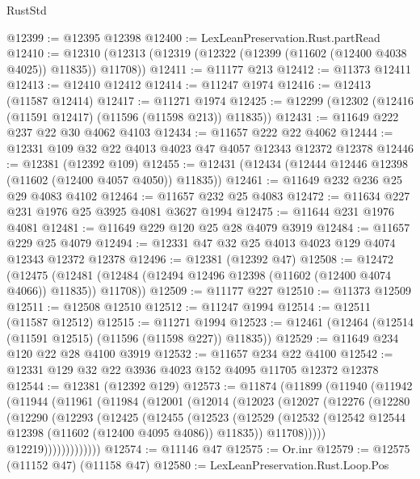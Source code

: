 \begin{lexlean}{RustStd}
\begin{coremodule}
@12399 := @12395 @12398
@12400 := LexLeanPreservation.Rust.partRead
@12410 := @12310 (@12313 (@12319 (@12322 (@12399 (@11602 (@12400 @4038 @4025)) @11835)) @11708))
@12411 := @11177 @213
@12412 := @11373 @12411
@12413 := @12410 @12412
@12414 := @11247 @1974
@12416 := @12413 (@11587 @12414)
@12417 := @11271 @1974
@12425 := @12299 (@12302 (@12416 (@11591 @12417) (@11596 (@11598 @213)) @11835))
@12431 := @11649 @222 @237 @22 @30 @4062 @4103
@12434 := @11657 @222 @22 @4062
@12444 := @12331 @109 @32 @22 @4013 @4023 @47 @4057 @12343 @12372 @12378
@12446 := @12381 (@12392 @109)
@12455 := @12431 (@12434 (@12444 @12446 @12398 (@11602 (@12400 @4057 @4050)) @11835))
@12461 := @11649 @232 @236 @25 @29 @4083 @4102
@12464 := @11657 @232 @25 @4083
@12472 := @11634 @227 @231 @1976 @25 @3925 @4081 @3627 @1994
@12475 := @11644 @231 @1976 @4081
@12481 := @11649 @229 @120 @25 @28 @4079 @3919
@12484 := @11657 @229 @25 @4079
@12494 := @12331 @47 @32 @25 @4013 @4023 @129 @4074 @12343 @12372 @12378
@12496 := @12381 (@12392 @47)
@12508 := @12472
    (@12475 (@12481 (@12484 (@12494 @12496 @12398 (@11602 (@12400 @4074 @4066)) @11835)) @11708))
@12509 := @11177 @227
@12510 := @11373 @12509
@12511 := @12508 @12510
@12512 := @11247 @1994
@12514 := @12511 (@11587 @12512)
@12515 := @11271 @1994
@12523 := @12461 (@12464 (@12514 (@11591 @12515) (@11596 (@11598 @227)) @11835))
@12529 := @11649 @234 @120 @22 @28 @4100 @3919
@12532 := @11657 @234 @22 @4100
@12542 := @12331 @129 @32 @22 @3936 @4023 @152 @4095 @11705 @12372 @12378
@12544 := @12381 (@12392 @129)
@12573 := @11874
    (@11899
      (@11940
        (@11942
          (@11944
            (@11961
              (@11984
                (@12001
                  (@12014
                    (@12023
                      (@12027
                        (@12276
                          (@12280
                            (@12290
                              (@12293
                                (@12425
                                  (@12455
                                    (@12523
                                      (@12529
                                        (@12532
                                          (@12542
                                            @12544
                                            @12398
                                            (@11602 (@12400 @4095 @4086))
                                            @11835))
                                        @11708)))))
                              @12219)))))))))))))
@12574 := @11146 @47
@12575 := Or.inr
@12579 := @12575 (@11152 @47) (@11158 @47)
@12580 := LexLeanPreservation.Rust.Loop.Pos

\end{coremodule}
\end{lexlean}
